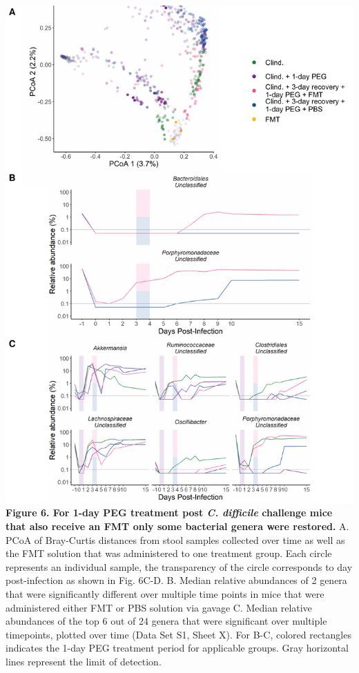\documentclass[
  11pt,
]{article}
\begin{document}
\includegraphics{figure_6.pdf} \textbf{Figure 6. For 1-day PEG treatment
post \emph{C. difficile} challenge mice that also receive an FMT only
some bacterial genera were restored.} A. PCoA of Bray-Curtis distances
from stool samples collected over time as well as the FMT solution that
was administered to one treatment group. Each circle represents an
individual sample, the transparency of the circle corresponds to day
post-infection as shown in Fig. 6C-D. B. Median relative abundances of 2
genera that were significantly different over multiple time points in
mice that were administered either FMT or PBS solution via gavage C.
Median relative abundances of the top 6 out of 24 genera that were
significant over multiple timepoints, plotted over time (Data Set S1,
Sheet X). For B-C, colored rectangles indicates the 1-day PEG treatment
period for applicable groups. Gray horizontal lines represent the limit
of detection.
\end{document}
